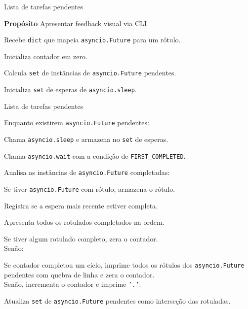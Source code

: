 \documentclass[12pt]{beamer}
\newcounter{contador}
\begin{document}
\begin{frame}[fragile]{Lista de tarefas pendentes}
  \footnotesize{\textbf{Propósito} Apresentar feedback visual via CLI\\
  \begin{enumerate}\scriptsize{
    \item Recebe \texttt{dict} que mapeia \texttt{asyncio.Future} para um rótulo.
    \item Inicializa contador em zero.
    \item Calcula \texttt{set} de instâncias de \texttt{asyncio.Future} pendentes.
    \item Inicializa \texttt{set} de esperas de \texttt{asyncio.sleep}.
    \setcounter{contador}{\value{enumi}}
  }\end{enumerate}}
\end{frame}

\begin{frame}[fragile]{Lista de tarefas pendentes}
  \begin{enumerate}
    \scriptsize{
    \setcounter{enumi}{\value{contador}}
    \item Enquanto existirem \texttt{asyncio.Future} pendentes:
      \begin{enumerate}\scriptsize{
        \item Chama \texttt{asyncio.sleep} e armazena no \texttt{set} de esperas.
        \item Chama \texttt{asyncio.wait} com a condição de \texttt{FIRST\_COMPLETED}.
        \item Analisa as instâncias de \texttt{asyncio.Future} completadas:
          \begin{itemize}\scriptsize{
            \item Se tiver \texttt{asyncio.Future} com rótulo, armazena o rótulo.
            \item Registra se a espera mais recente estiver completa.
          }\end{itemize}
        \item Apresenta todos os rotulados completados na ordem.
        \item Se tiver algum rotulado completo, zera o contador.\\
              Senão:
           \begin{itemize}\scriptsize{
            \item[] Se contador completou um ciclo, imprime todos os rótulos dos
                     \texttt{asyncio.Future} pendentes com quebra de linha e zera o contador.\\
                    Senão, incrementa o contador e imprime \texttt{'.'}.
          }\end{itemize}
        \item Atualiza \texttt{set} de \texttt{asyncio.Future} pendentes como interseção das rotuladas.
      }\end{enumerate}
  }\end{enumerate}
\end{frame}
\end{document}
